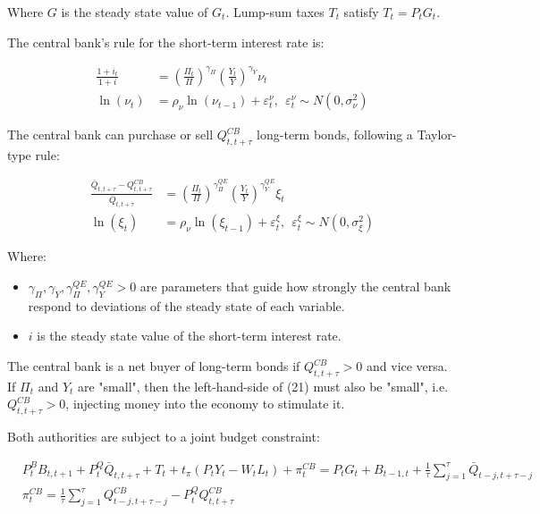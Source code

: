 \documentclass[12pt]{article}
\begin{document}
Where $G$ is the steady state value of $G_t$. Lump-sum taxes $T_t$ satisfy $T_t = P_tG_t$.

The central bank's rule for the short-term interest rate is:

\begin{align*}
    \frac{1 + i_t}{1 + i} &= \left(\frac{\Pi_t}{\Pi}\right)^{\gamma_\Pi}\left(\frac{Y_t}{Y}\right)^{\gamma_Y} \nu_t \tag{19}\\
    \ln(\nu_t) &= \rho_\nu \ln(\nu_{t-1}) + \varepsilon_t^\nu, ~~ \varepsilon_t^\nu \sim N(0, \sigma^2_\nu) \tag{20}
\end{align*}

The central bank can purchase or sell $Q^{CB}_{t, t+\tau}$ long-term bonds, following a Taylor-type rule:

\begin{align*}
    \frac{\bar Q_{t, t+\tau} - Q^{CB}_{t, t+\tau}}{\bar Q_{t, t+\tau}} &= \left(\frac{\Pi_t}{\Pi}\right)^{\gamma^{QE}_\Pi}\left(\frac{Y_t}{Y}\right)^{\gamma^{QE}_Y}\xi_t \tag{21}\\
    \ln(\xi_t) &= \rho_\nu \ln(\xi_{t-1}) + \varepsilon_t^\xi, ~~ \varepsilon_t^\xi \sim N(0, \sigma^2_\xi) \tag{22}
\end{align*}

Where:

\begin{itemize}
    \item $\gamma_\Pi, \gamma_Y, \gamma^{QE}_\Pi, \gamma^{QE}_Y > 0$ are parameters that guide how strongly the central bank respond to deviations of the steady state of each variable.
    \item $i$ is the steady state value of the short-term interest rate.
\end{itemize}

The central bank is a net buyer of long-term bonds if $Q^{CB}_{t, t+\tau} > 0$ and vice versa. If $\Pi_t$ and $Y_t$ are "small", then the left-hand-side of (21) must also be "small", i.e. $Q^{CB}_{t, t+\tau} > 0$, injecting money into the economy to stimulate it.

Both authorities are subject to a joint budget constraint:

\begin{align*}
    &P_{t}^{B}B_{t,t+1}+P_{t}^{Q}\bar{Q}_{t,t+\tau}+T_{t}+t_{\pi}(P_{t}Y_{t}-W_{t}L_{t})+\pi_{t}^{C B}=P_{t}G_{t}+B_{t-1,t}+{\frac{1}{\tau}}\sum_{j=1}^{\tau}\bar{Q}_{t-j,t+\tau-j}\\
    &\pi^{CB}_t = {\frac{1}{\tau}}\sum_{j=1}^{\tau}Q^{CB}_{t-j,t+\tau-j} - P^Q_tQ^{CB}_{t,t+\tau}
\end{align*}
\end{document}
